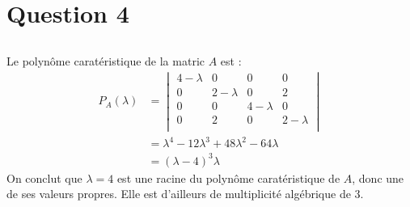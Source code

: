 \section*{Question 4}
\subsection{}
Le polynôme caratéristique de la matric $A$ est :
\[\begin{split} P_A(\lambda)&=
\begin{vmatrix}
4-\lambda  & 0 & 0 & 0 \\
0 & 2-\lambda  & 0 & 2 \\
0 & 0 & 4-\lambda  & 0 \\
0 & 2 & 0 & 2-\lambda  \\
\end{vmatrix}\\
&=\lambda ^4-12 \lambda ^3+48 \lambda ^2-64 \lambda\\
&=(\lambda -4)^3 \lambda
\end{split}\]
On conclut que $\lambda = 4$ est une racine du polynôme caratéristique de $A$, donc une de ses valeurs propres. Elle est d'ailleurs de multiplicité algébrique de 3.
